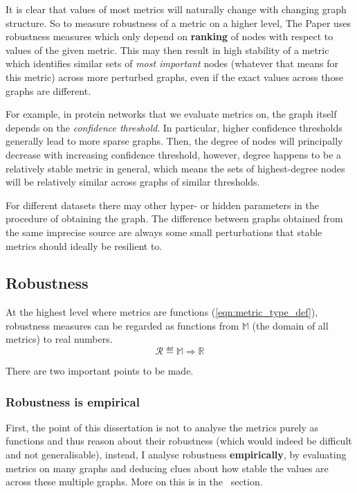 It is clear that values of most metrics will naturally change with changing graph structure.
So to measure robustness of a metric on a higher level, The Paper uses robustness measures which only depend on \textbf{ranking} of nodes with respect to values of the given metric.
This may then result in high stability of a metric which identifies similar sets of \textsl{most important} nodes (whatever that means for this metric) across more perturbed graphs, even if the exact values across those graphs are different.

\parspace

For example, in protein networks that we evaluate metrics on, the graph itself depends on the \textsl{confidence threshold}.
In particular, higher confidence thresholds generally lead to more sparse graphs.
Then, the degree of nodes will principally decrease with increasing confidence threshold, however, degree happens to be a relatively stable metric in general, which means the sets of highest-degree nodes will be relatively similar across graphs of similar thresholds.

For different datasets there may other hyper- or hidden parameters in the procedure of obtaining the graph.
The difference between graphs obtained from the same imprecise source are always some small perturbations that stable metrics should ideally be resilient to.

\subsection{Robustness}

At the highest level where metrics are functions (\autoref{eqn:metric_type_def}), robustness measures can be regarded as functions from $\mathbb{M}$ (the domain of all metrics) to real numbers.
\begin{equation}
    \mathcal{R} \eqdef \mathbb{M} \Rightarrow \mathbb{R}
\end{equation}

There are two important points to be made.

\subsubsection*{Robustness is empirical}

First, the point of this dissertation is not to analyse the metrics purely as functions and thus reason about their robustness (which would indeed be difficult and not generalisable), instead, I analyse robustness \textbf{empirically}, by evaluating metrics on many graphs and deducing clues about how stable the values are across these multiple graphs.
More on this is in the~ section.

